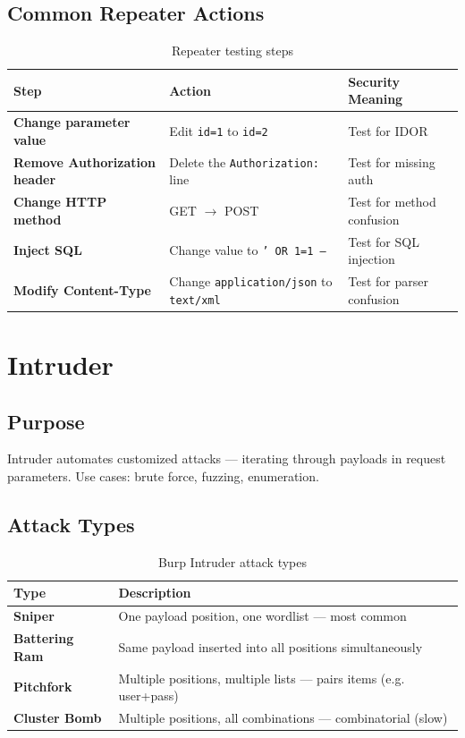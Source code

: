 \subsection{Common Repeater Actions}

\begin{table}[H]
\centering
\caption{Repeater testing steps}
\begin{tabularx}{\textwidth}{>{\bfseries}lXX}
\toprule
Step & Action & Security Meaning \\
\midrule
Change parameter value & Edit \texttt{id=1} to \texttt{id=2} & Test for IDOR \\
Remove Authorization header & Delete the \texttt{Authorization:} line & Test for missing auth \\
Change HTTP method & GET $\to$ POST & Test for method confusion \\
Inject SQL & Change value to \texttt{' OR 1=1 --} & Test for SQL injection \\
Modify Content-Type & Change \texttt{application/json} to \texttt{text/xml} & Test for parser confusion \\
\bottomrule
\end{tabularx}
\end{table}

\section{Intruder}
\label{sec:intruder}

\subsection{Purpose}

Intruder automates customized attacks — iterating through payloads in request parameters. Use cases: brute force, fuzzing, enumeration.

\subsection{Attack Types}

\begin{table}[H]
\centering
\caption{Burp Intruder attack types}
\begin{tabularx}{\textwidth}{>{\bfseries}lX}
\toprule
Type & Description \\
\midrule
Sniper & One payload position, one wordlist — most common \\
Battering Ram & Same payload inserted into all positions simultaneously \\
Pitchfork & Multiple positions, multiple lists — pairs items (e.g. user+pass) \\
Cluster Bomb & Multiple positions, all combinations — combinatorial (slow) \\
\bottomrule
\end{tabularx}
\end{table}

